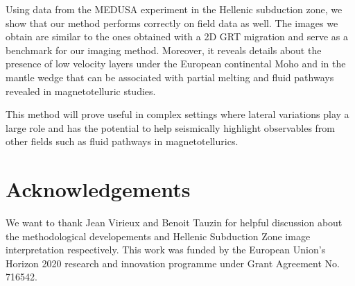 \documentclass[10pt,a4paper]{article}
\numberwithin{equation}{section}
\begin{document}
Using data from the MEDUSA experiment in the Hellenic subduction zone, we show that our method performs correctly on field data as well.
The images we obtain are similar to the ones obtained with a 2D GRT migration and serve as a benchmark for our imaging method.
Moreover, it reveals details about the presence of low velocity layers under the European continental Moho and in the mantle wedge that can be associated with partial melting and fluid pathways revealed in magnetotelluric studies.

This method will prove useful in complex settings where lateral variations play a large role and has the potential to help seismically highlight observables from other fields such as fluid pathways in magnetotellurics.

\section*{Acknowledgements}

We want to thank Jean Virieux and Benoit Tauzin for helpful discussion about the methodological developements and Hellenic Subduction Zone image interpretation respectively.
This work was funded by the European Union’s Horizon 2020 research and innovation programme under Grant Agreement No. 716542.


%


\end{document}
